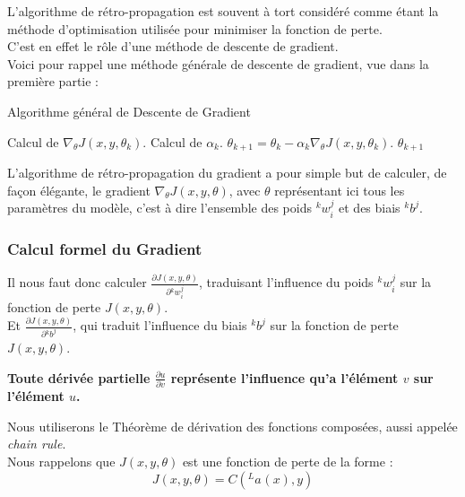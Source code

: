 \documentclass[10pt,a4paper]{report}
\newcommand{\lexp}[1]{\phantom{}^{#1}}
\newcommand{\elem}[4]{\lexp{#2}#1^{#3}_{#4}}
\begin{document}
		L'algorithme de rétro-propagation est souvent à tort considéré comme étant la méthode d'optimisation utilisée pour minimiser la fonction de perte.\\
		C'est en effet le rôle d'une méthode de descente de gradient.\\
		Voici pour rappel une méthode générale de descente de gradient, vue dans la première partie :
		\begin{algorithm}[H]
			\caption{Algorithme général de Descente de Gradient}
			\begin{algorithmic}
			    \REPEAT
			    	\STATE Calcul de $\nabla_\theta J(x,y,\theta_k)$.
			    	\STATE Calcul de $\alpha_k$.
			    	\STATE $\theta_{k+1} = \theta_k - \alpha_k \nabla_\theta J(x,y,\theta_k)$.
			    \RETURN $\theta_{k+1}$
			\end{algorithmic}
		\end{algorithm}
		L'algorithme de rétro-propagation du gradient a pour simple but de calculer, de façon élégante, le gradient $\nabla_\theta J(x,y,\theta)$, avec $\theta$ représentant ici tous les paramètres du modèle, c'est à dire l'ensemble des poids $\elem{w}{k}{j}{i}$ et des biais $\elem{b}{k}{j}{}$.\\
		
			\subsubsection{Calcul formel du Gradient}
			
				Il nous faut donc calculer $\frac{\partial J(x,y,\theta)}{\partial \elem{w}{k}{j}{i}}$, traduisant l'influence du poids $\elem{w}{k}{j}{i}$ sur la fonction de perte $J(x,y,\theta)$.\\
				Et $\frac{\partial J(x,y,\theta)}{\partial \elem{b}{k}{j}{}}$, qui traduit l'influence du biais $\elem{b}{k}{j}{}$ sur la fonction de perte $J(x,y,\theta)$.\\
				\begin{center}
				\textbf{Toute dérivée partielle $\frac{\partial u}{\partial v}$ représente l'influence qu'a l'élément $v$ sur l'élément $u$.}
				\end{center}
				Nous utiliserons le Théorème de dérivation des fonctions composées, aussi appelée \emph{chain rule}.\\
				Nous rappelons que $J(x,y,\theta)$ est une fonction de perte de la forme :
				$$J(x,y,\theta) = C(\elem{a}{L}{}{}(x),y)$$
				
\end{document}
